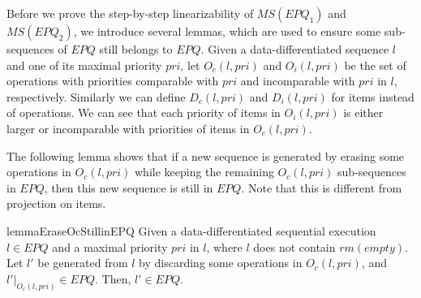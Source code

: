 Before we prove the step-by-step linearizability of $\textit{MS}(\textit{EPQ}_1)$ and $\textit{MS}(\textit{EPQ}_2)$, we introduce several lemmas, which are used to ensure some sub-sequences of $\textit{EPQ}$ still belongs to $\textit{EPQ}$. Given a data-differentiated sequence $l$ and one of its maximal priority $\textit{pri}$, let $O_c(l,\textit{pri})$ and $O_i(l,\textit{pri})$ be the set of operations with priorities comparable with $\textit{pri}$ and incomparable with $\textit{pri}$ in $l$, respectively. Similarly we can define $D_c(l,\textit{pri})$ and $D_i(l,\textit{pri})$ for items instead of operations. %
We can see that each priority of items in $O_i(l,\textit{pri})$ is either larger or incomparable with priorities of items in  $O_c(l,\textit{pri})$.

The following lemma shows that if a new sequence is generated by erasing some operations in $O_c(l,\textit{pri})$ while keeping the remaining $O_c(l,\textit{pri})$ sub-sequences in $\textit{EPQ}$, then this new sequence is still in $\textit{EPQ}$. Note that this is different from projection on items.

\begin{restatable}{lemma}{EraseOcStillinEPQ}
\label{lemma:erase Oc still in EPQ}
Given a data-differentiated sequential execution $l \in \textit{EPQ}$ and a maximal priority $\textit{pri}$ in $l$, where $l$ does not contain $\textit{rm}(\textit{empty})$. Let $l'$ be generated from $l$ by discarding some operations in $O_c(l,\textit{pri})$, and $l' \vert_{ O_c(l,\textit{pri}) } \in \textit{EPQ}$. Then, $l' \in \textit{EPQ}$.
\end{restatable}

